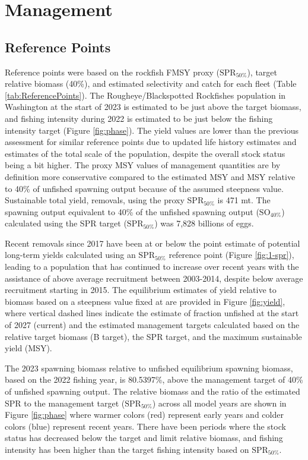 \documentclass[
]{scrartcl}
\begin{document}
\newpage{}

\section{Management}\label{management}

\subsection{Reference Points}\label{reference-points-1}

Reference points were based on the rockfish FMSY proxy
(\(\text{SPR}_{50\%}\)), target relative biomass (40\%), and estimated
selectivity and catch for each fleet (Table \ref{tab:ReferencePoints}).
The Rougheye/Blackspotted Rockfishes population in Washington at the
start of 2023 is estimated to be just above the target biomass, and
fishing intensity during 2022 is estimated to be just below the fishing
intensity target (Figure \ref{fig:phase}). The yield values are lower
than the previous assessment for similar reference points due to updated
life history estimates and estimates of the total scale of the
population, despite the overall stock status being a bit higher. The
proxy MSY values of management quantities are by definition more
conservative compared to the estimated MSY and MSY relative to 40\% of
unfished spawning output because of the assumed steepness value.
Sustainable total yield, removals, using the proxy \(\text{SPR}_{50\%}\)
is 471 mt. The spawning output equivalent to 40\% of the unfished
spawning output (\(\text{SO}_{40\%}\)) calculated using the SPR target
(\(\text{SPR}_{50\%}\)) was 7,828 billions of eggs.

Recent removals since 2017 have been at or below the point estimate of
potential long-term yields calculated using an \(\text{SPR}_{50\%}\)
reference point (Figure \ref{fig:1-spr}), leading to a population that
has continued to increase over recent years with the assistance of above
average recruitment between 2003-2014, despite below average recruitment
starting in 2015. The equilibrium estimates of yield relative to biomass
based on a steepness value fixed at are provided in Figure
\ref{fig:yield}, where vertical dashed lines indicate the estimate of
fraction unfished at the start of 2027 (current) and the estimated
management targets calculated based on the relative target biomass (B
target), the SPR target, and the maximum sustainable yield (MSY).

The 2023 spawning biomass relative to unfished equilibrium spawning
biomass, based on the 2022 fishing year, is 80.5397\%, above the
management target of 40\% of unfished spawning output. The relative
biomass and the ratio of the estimated SPR to the management target
(\(\text{SPR}_{50\%}\)) across all model years are shown in Figure
\ref{fig:phase} where warmer colors (red) represent early years and
colder colors (blue) represent recent years. There have been periods
where the stock status has decreased below the target and limit relative
biomass, and fishing intensity has been higher than the target fishing
intensity based on \(\text{SPR}_{50\%}\).
\end{document}
